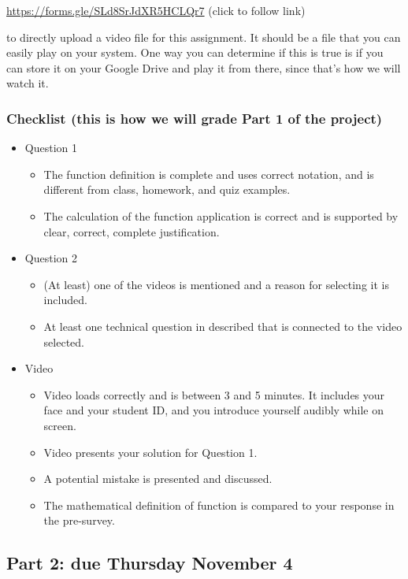 \documentclass[12pt, oneside]{article}
\begin{document}
\url{https://forms.gle/SLd8SrJdXR5HCLQr7}  (click to follow link) 

to directly upload a video file for this assignment.
It should be a file that you can easily play on your system. 
One way you can determine if this is true is if you can store it on your Google Drive and play it from there,
since that's how we will watch it.

\subsubsection*{Checklist (this is how we will grade Part 1 of the project)}
\begin{itemize}
\item Question 1
    \begin{itemize}
        \item The function definition is complete and uses correct notation, 
        and is different from class, homework, and quiz examples.
        \item The calculation of the function application is correct and is 
        supported by clear, correct, complete justification.
    \end{itemize}
\item Question 2
    \begin{itemize}
        \item (At least) one of the videos is mentioned and a reason for selecting it is included.
        \item At least one technical question in described that is connected to the video selected.
    \end{itemize}
\item Video
    \begin{itemize}
        \item Video loads correctly and is between 3 and 5 minutes. It includes your face and your student ID, 
        and you introduce yourself audibly while on screen.
        \item Video presents your solution for Question 1.
        \item A potential mistake is presented and discussed.
        \item The mathematical definition of function is compared to your response in the pre-survey.
    \end{itemize}
\end{itemize}

\newpage
\subsection*{Part 2: due Thursday November 4}
\end{document}
